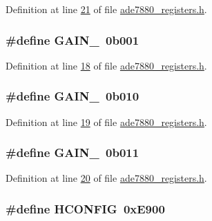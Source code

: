 Definition at line \hyperlink{a00036_source_l00021}{21} of file \hyperlink{a00036_source}{ade7880\-\_\-registers.\-h}.

\hypertarget{a00036_a7ce9d36acd86736019606c4d928b7aad}{
\subsubsection[{G\-A\-I\-N\-\_\-2}]{\setlength{\rightskip}{0pt plus 5cm}\#define G\-A\-I\-N\-\_~0b001}}\label{de/d8c/a00036_a7ce9d36acd86736019606c4d928b7aad}


Definition at line \hyperlink{a00036_source_l00018}{18} of file \hyperlink{a00036_source}{ade7880\-\_\-registers.\-h}.

\hypertarget{a00036_a8720f417f5b56154123f813b2a011c46}{
\subsubsection[{G\-A\-I\-N\-\_\-4}]{\setlength{\rightskip}{0pt plus 5cm}\#define G\-A\-I\-N\-\_~0b010}}\label{de/d8c/a00036_a8720f417f5b56154123f813b2a011c46}


Definition at line \hyperlink{a00036_source_l00019}{19} of file \hyperlink{a00036_source}{ade7880\-\_\-registers.\-h}.

\hypertarget{a00036_a9b90b27f7ed8ebac69dd8b82df741872}{
\subsubsection[{G\-A\-I\-N\-\_\-8}]{\setlength{\rightskip}{0pt plus 5cm}\#define G\-A\-I\-N\-\_~0b011}}\label{de/d8c/a00036_a9b90b27f7ed8ebac69dd8b82df741872}


Definition at line \hyperlink{a00036_source_l00020}{20} of file \hyperlink{a00036_source}{ade7880\-\_\-registers.\-h}.

\hypertarget{a00036_a785b8c7df7ac430278aa1e89c0db69d9}{
\subsubsection[{H\-C\-O\-N\-F\-I\-G}]{\setlength{\rightskip}{0pt plus 5cm}\#define H\-C\-O\-N\-F\-I\-G~0x\-E900}}\label{de/d8c/a00036_a785b8c7df7ac430278aa1e89c0db69d9}


